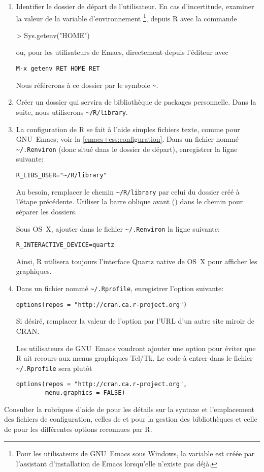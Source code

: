 \begin{enumerate}
\item Identifier le dossier de départ de l'utilisateur. En cas
  d'incertitude, examiner la valeur de la variable d'environnement
  \footnote{%
    Pour les utilisateurs de GNU~Emacs sous Windows, la variable est
    créée par l'assistant d'installation de Emacs lorsqu'elle n'existe
    pas déjà.}, %
  depuis R avec la commande
\begin{Schunk}
\begin{Sinput}
> Sys.getenv("HOME")
\end{Sinput}
\end{Schunk}
  ou, pour les utilisateurs de Emacs, directement depuis l'éditeur avec
\begin{verbatim}
M-x getenv RET HOME RET
\end{verbatim}
  Nous référerons à ce dossier par le symbole \verb=~=.
\item Créer un dossier qui servira de bibliothèque de packages
  personnelle. Dans la suite, nous utiliserons \verb=~/R/library=.
\item La configuration de R se fait à l'aide simples fichiers texte,
  comme pour GNU~Emacs; voir la \autoref{emacs+ess:configuration}.
  Dans un fichier nommé \verb=~/.Renviron= (donc situé dans le dossier
  de départ), enregistrer la ligne suivante:
\begin{verbatim}
R_LIBS_USER="~/R/library"
\end{verbatim}
  Au besoin, remplacer le chemin \verb=~/R/library= par celui du
  dossier créé à l'étape précédente. Utiliser la barre oblique avant
  (\code{/}) dans le chemin pour séparer les dossiers.
  \begin{osx}
    Sous OS~X, ajouter dans le fichier \verb=~/.Renviron= la ligne
    suivante:
\begin{verbatim}
R_INTERACTIVE_DEVICE=quartz
\end{verbatim}
    Ainsi, R utilisera toujours l'interface Quartz native
    de OS~X pour afficher les graphiques.
  \end{osx}
\item Dans un fichier nommé \verb=~/.Rprofile=, enregistrer l'option
  suivante:
\begin{verbatim}
options(repos = "http://cran.ca.r-project.org")
\end{verbatim}
  Si désiré, remplacer la valeur de l'option  par l'URL
  d'un autre site miroir de CRAN.

  Les utilisateurs de GNU~Emacs voudront ajouter une option pour
  éviter que R ait recours aux menus graphiques Tcl/Tk. Le code à
  entrer dans le fichier \verb=~/.Rprofile= sera plutôt
\begin{verbatim}
options(repos = "http://cran.ca.r-project.org",
        menu.graphics = FALSE)
\end{verbatim}
\end{enumerate}
Consulter la rubriques d'aide de  pour les détails sur
la syntaxe et l'emplacement des fichiers de configuration, celles de
 et  pour la gestion des bibliothèques
et celle de  pour les différentes options reconnues par
R.

